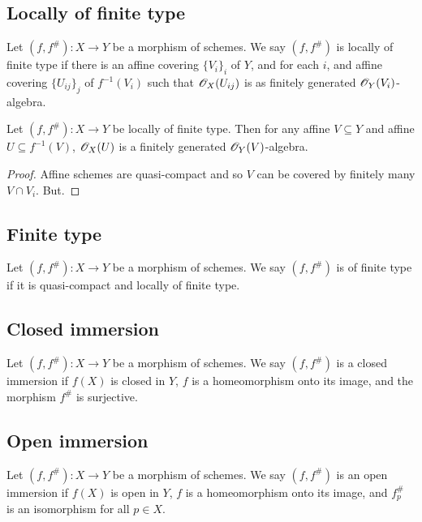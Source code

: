 \documentclass{memoir}
\begin{document}
\subsection{Locally of finite type}
\begin{definition}
    Let $(f,f^\#):X\to Y$ be a morphism of schemes.
    We say $(f,f^\#)$ is locally of finite type if there is an affine covering $\{V_i\}_i$ of $Y$, and for each $i$, and affine covering $\{U_{ij}\}_j$ of $f^{-1}(V_i)$ such that $\mathscr{O}_X(U_{ij})$ is as finitely generated $\mathscr{O}_Y(V_i)$-algebra.
\end{definition}
\begin{proposition}
    Let $(f,f^\#):X\to Y$ be locally of finite type.
    Then for any affine $V\subseteq Y$ and affine $U\subseteq f^{-1}(V)$, $\mathscr{O}_X(U)$ is a finitely generated $\mathscr{O}_Y(V)$-algebra.
\end{proposition}
\begin{proof}
    Affine schemes are quasi-compact and so $V$ can be covered by finitely many $V\cap V_i$.
    But.
\end{proof}
\subsection{Finite type}
\begin{definition}
    Let $(f,f^\#):X\to Y$ be a morphism of schemes.
    We say $(f,f^\#)$ is of finite type if it is quasi-compact and locally of finite type.
\end{definition}
\subsection{Closed immersion}
\begin{definition}
    Let $(f,f^\#):X\to Y$ be a morphism of schemes.
    We say $(f,f^\#)$ is a closed immersion if $f(X)$ is closed in $Y$, $f$ is a homeomorphism onto its image, and the morphism $f^\#$ is surjective.
\end{definition}
\subsection{Open immersion}
\begin{definition}
    Let $(f,f^\#):X\to Y$ be a morphism of schemes.
    We say $(f,f^\#)$ is an open immersion if $f(X)$ is open in $Y$, $f$ is a homeomorphism onto its image, and $f_p^\#$ is an isomorphism for all $p\in X$.
\end{definition}
\end{document}
